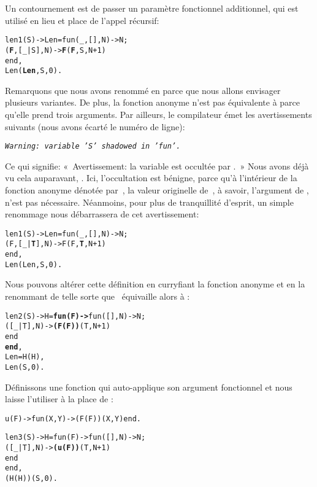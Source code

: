 Un contournement est de passer un paramètre fonctionnel additionnel,
qui est utilisé en lieu et place de l'appel récursif:
\begin{alltt}
len1(S) -> Len = fun(_,   [],N) -> N;
                    (\textbf{F},[\_|S],N) -> \textbf{F}(\textbf{F},S,N+1)
                 end,
           Len(\textbf{Len},S,0).
\end{alltt}
Remarquons que nous avons renommé  en 
parce que nous allons envisager plusieurs variantes. De plus, la
fonction anonyme n'est pas équivalente à  parce qu'elle
prend trois arguments. Par ailleurs, le compilateur émet les
avertissements suivants (nous avons écarté le numéro de ligne):
\begin{center}
\emph{\texttt{Warning: variable 'S' shadowed in 'fun'.}}
\end{center}
Ce qui signifie: «~Avertissement: la variable  est occultée
par .~» Nous avons déjà vu cela auparavant,
. Ici, l'occultation est bénigne, parce qu'à
l'intérieur de la fonction anonyme dénotée par~, la
valeur originelle de~, à savoir, l'argument de
, n'est pas nécessaire. Néanmoins, pour plus de
tranquillité d'esprit, un simple renommage nous débarrassera de cet
avertissement:
\begin{alltt}
len1(S) -> Len = fun(_,   [],N) -> N;
                    (F,[\_|\textbf{T}],N) -> F(F,\textbf{T},N+1)\hfill% \emph{Renommage}
                 end,
           Len(Len,S,0).
\end{alltt}
Nous pouvons altérer cette définition en curryfiant la fonction
anonyme et en la renommant de telle sorte que ~équivaille
alors à :
\begin{alltt}
len2(S) -> H = \textbf{fun(F) ->} fun(   [],N) -> N;
                            ([\_|T],N) -> \textbf{(F(F))}(T,N+1)
                         end
               \textbf{end},
           Len = H(H),\hfill% \emph{Équivaut à} fun len/2
           Len(S,0).
\end{alltt}
Définissons une fonction  qui auto-applique son argument
fonctionnel et nous laisse l'utiliser à la place de :
\begin{alltt}
u(F) -> fun(X,Y) -> (F(F))(X,Y) end.\hfill% \emph{Auto-application}

len3(S) -> H = fun(F) -> fun(   [],N) -> N;
                            ([\_|T],N) -> \textbf{(u(F))}(T,N+1)
                         end
               end,
           (H(H))(S,0).\hfill% Len \emph{expansée}
\end{alltt}
